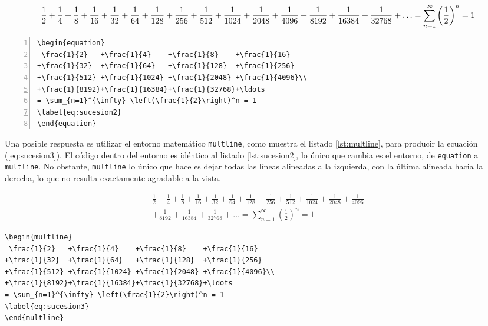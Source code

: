 \begin{equation}
 \frac{1}{2}   +\frac{1}{4}    +\frac{1}{8}    +\frac{1}{16}
+\frac{1}{32}  +\frac{1}{64}   +\frac{1}{128}  +\frac{1}{256}
+\frac{1}{512} +\frac{1}{1024} +\frac{1}{2048} +\frac{1}{4096}\\
+\frac{1}{8192}+\frac{1}{16384}+\frac{1}{32768}+\ldots
= \sum_{n=1}^{\infty} \left(\frac{1}{2}\right)^n = 1
\label{eq:sucesion2}
\end{equation}

\begin{lstlisting}[style=latex,numbers=left,caption={Sucesión con términos que desbordan una línea.},label=lst:sucesion2]
\begin{equation}
 \frac{1}{2}   +\frac{1}{4}    +\frac{1}{8}    +\frac{1}{16}
+\frac{1}{32}  +\frac{1}{64}   +\frac{1}{128}  +\frac{1}{256}
+\frac{1}{512} +\frac{1}{1024} +\frac{1}{2048} +\frac{1}{4096}\\
+\frac{1}{8192}+\frac{1}{16384}+\frac{1}{32768}+\ldots
= \sum_{n=1}^{\infty} \left(\frac{1}{2}\right)^n = 1
\label{eq:sucesion2}
\end{equation}
\end{lstlisting}

Una posible respuesta es utilizar el entorno matemático \texttt{multline}, como muestra el listado \ref{lst:multline}, para producir la ecuación (\ref{eq:sucesion3}). El código dentro del entorno es idéntico al listado \ref{lst:sucesion2}, lo único que cambia es el entorno, de \texttt{equation} a \texttt{multline}. No obstante, \texttt{multline} lo único que hace es dejar todas las líneas alineadas a la izquierda, con la última alineada hacia la derecha, lo que no resulta exactamente agradable a la vista.

\begin{multline}
 \frac{1}{2}   +\frac{1}{4}    +\frac{1}{8}    +\frac{1}{16}
+\frac{1}{32}  +\frac{1}{64}   +\frac{1}{128}  +\frac{1}{256}
+\frac{1}{512} +\frac{1}{1024} +\frac{1}{2048} +\frac{1}{4096}\\
+\frac{1}{8192}+\frac{1}{16384}+\frac{1}{32768}+\ldots
= \sum_{n=1}^{\infty} \left(\frac{1}{2}\right)^n = 1
\label{eq:sucesion3}
\end{multline}

\begin{lstlisting}[style=latex,caption={Sucesión en dos líneas.},label=lst:multline]
\begin{multline}
 \frac{1}{2}   +\frac{1}{4}    +\frac{1}{8}    +\frac{1}{16}
+\frac{1}{32}  +\frac{1}{64}   +\frac{1}{128}  +\frac{1}{256}
+\frac{1}{512} +\frac{1}{1024} +\frac{1}{2048} +\frac{1}{4096}\\
+\frac{1}{8192}+\frac{1}{16384}+\frac{1}{32768}+\ldots
= \sum_{n=1}^{\infty} \left(\frac{1}{2}\right)^n = 1
\label{eq:sucesion3}
\end{multline}
\end{lstlisting}



